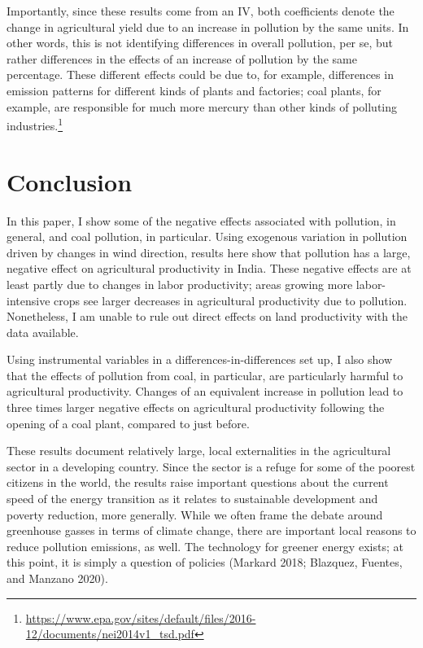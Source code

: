 \documentclass[
]{article}
\begin{document}
Importantly, since these results come from an IV, both coefficients denote the change in agricultural yield due to an increase in pollution by the same units. In other words, this is not identifying differences in overall pollution, per se, but rather differences in the effects of an increase of pollution by the same percentage. These different effects could be due to, for example, differences in emission patterns for different kinds of plants and factories; coal plants, for example, are responsible for much more mercury than other kinds of polluting industries.\footnote{\url{https://www.epa.gov/sites/default/files/2016-12/documents/nei2014v1_tsd.pdf}}

\hypertarget{conclusion}{%
\section{Conclusion}\label{conclusion}}

\label{conclusion}

In this paper, I show some of the negative effects associated with pollution, in general, and coal pollution, in particular. Using exogenous variation in pollution driven by changes in wind direction, results here show that pollution has a large, negative effect on agricultural productivity in India. These negative effects are at least partly due to changes in labor productivity; areas growing more labor-intensive crops see larger decreases in agricultural productivity due to pollution. Nonetheless, I am unable to rule out direct effects on land productivity with the data available.

Using instrumental variables in a differences-in-differences set up, I also show that the effects of pollution from coal, in particular, are particularly harmful to agricultural productivity. Changes of an equivalent increase in pollution lead to three times larger negative effects on agricultural productivity following the opening of a coal plant, compared to just before.

These results document relatively large, local externalities in the agricultural sector in a developing country. Since the sector is a refuge for some of the poorest citizens in the world, the results raise important questions about the current speed of the energy transition as it relates to sustainable development and poverty reduction, more generally. While we often frame the debate around greenhouse gasses in terms of climate change, there are important local reasons to reduce pollution emissions, as well. The technology for greener energy exists; at this point, it is simply a question of policies (Markard 2018; Blazquez, Fuentes, and Manzano 2020).
\end{document}
